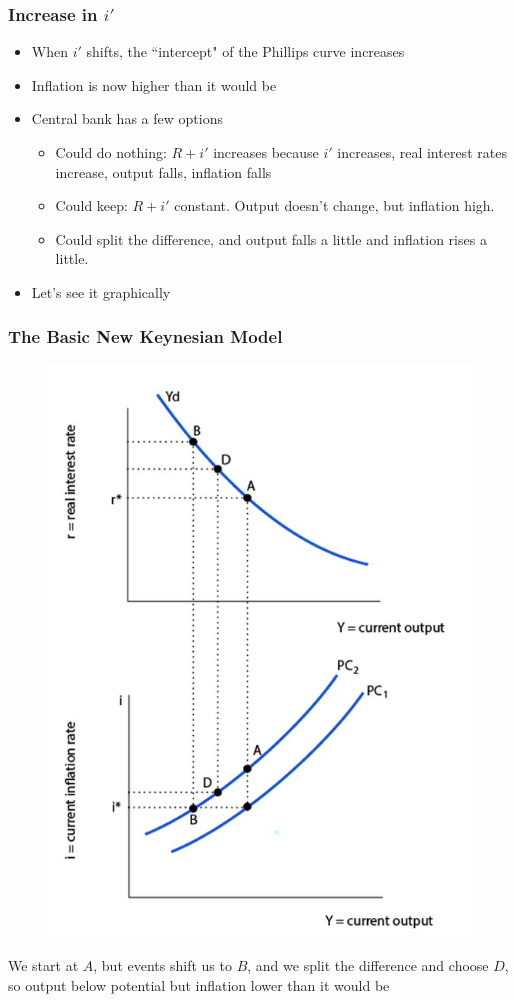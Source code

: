 \documentclass{beamer}
\begin{document}
\begin{frame}
\frametitle[alignment=center]{Increase in $i'$}
\begin{itemize}
\item When $i'$ shifts, the ``intercept" of the Phillips curve increases
\bigskip
\item Inflation is now higher than it would be
\bigskip
\item Central bank has a few options
\begin{itemize}
\item Could do nothing: $R+i'$ increases because $i'$ increases, real interest rates increase, output falls, inflation falls
\item Could keep: $R+i'$ constant.  Output doesn't change, but inflation high.
\item Could split the difference, and output falls a little and inflation rises a little.
\end{itemize}
\item Let's see it graphically
\end{itemize}
\end{frame}


\begin{frame}
\frametitle[alignment=center]{The Basic New Keynesian Model}
\begin{figure}
\centering
\includegraphics[scale=0.5]{Figures/W_Fig_15pt3.png}
\end{figure}
We start at $A$, but events shift us to $B$, and we split the difference and choose $D$, so output below potential but inflation lower than it would be
\end{frame}
\end{document}
